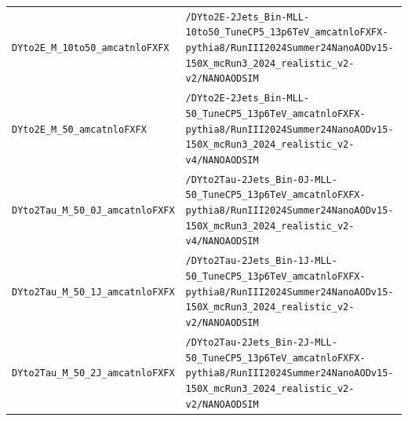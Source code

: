 \begin{longtable}{@{}>{\RaggedRight\arraybackslash}p{} >{\RaggedRight\arraybackslash}p{}@{}}
\addlinespace[2pt]
\texttt{DYto2E\_\allowbreak{}M\_\allowbreak{}10to50\_\allowbreak{}amcatnloFXFX} & \texttt{/\allowbreak{}DYto2E-\allowbreak{}2Jets\_\allowbreak{}Bin-\allowbreak{}MLL-\allowbreak{}10to50\_\allowbreak{}TuneCP5\_\allowbreak{}13p6TeV\_\allowbreak{}amcatnloFXFX-\allowbreak{}pythia8/\allowbreak{}RunIII2024Summer24NanoAODv15-\allowbreak{}150X\_\allowbreak{}mcRun3\_\allowbreak{}2024\_\allowbreak{}realistic\_\allowbreak{}v2-\allowbreak{}v2/\allowbreak{}NANOAODSIM} \\
\addlinespace[2pt]
\texttt{DYto2E\_\allowbreak{}M\_\allowbreak{}50\_\allowbreak{}amcatnloFXFX} & \texttt{/\allowbreak{}DYto2E-\allowbreak{}2Jets\_\allowbreak{}Bin-\allowbreak{}MLL-\allowbreak{}50\_\allowbreak{}TuneCP5\_\allowbreak{}13p6TeV\_\allowbreak{}amcatnloFXFX-\allowbreak{}pythia8/\allowbreak{}RunIII2024Summer24NanoAODv15-\allowbreak{}150X\_\allowbreak{}mcRun3\_\allowbreak{}2024\_\allowbreak{}realistic\_\allowbreak{}v2-\allowbreak{}v4/\allowbreak{}NANOAODSIM} \\
\addlinespace[2pt]
\texttt{DYto2Tau\_\allowbreak{}M\_\allowbreak{}50\_\allowbreak{}0J\_\allowbreak{}amcatnloFXFX} & \texttt{/\allowbreak{}DYto2Tau-\allowbreak{}2Jets\_\allowbreak{}Bin-\allowbreak{}0J-\allowbreak{}MLL-\allowbreak{}50\_\allowbreak{}TuneCP5\_\allowbreak{}13p6TeV\_\allowbreak{}amcatnloFXFX-\allowbreak{}pythia8/\allowbreak{}RunIII2024Summer24NanoAODv15-\allowbreak{}150X\_\allowbreak{}mcRun3\_\allowbreak{}2024\_\allowbreak{}realistic\_\allowbreak{}v2-\allowbreak{}v4/\allowbreak{}NANOAODSIM} \\
\addlinespace[2pt]
\texttt{DYto2Tau\_\allowbreak{}M\_\allowbreak{}50\_\allowbreak{}1J\_\allowbreak{}amcatnloFXFX} & \texttt{/\allowbreak{}DYto2Tau-\allowbreak{}2Jets\_\allowbreak{}Bin-\allowbreak{}1J-\allowbreak{}MLL-\allowbreak{}50\_\allowbreak{}TuneCP5\_\allowbreak{}13p6TeV\_\allowbreak{}amcatnloFXFX-\allowbreak{}pythia8/\allowbreak{}RunIII2024Summer24NanoAODv15-\allowbreak{}150X\_\allowbreak{}mcRun3\_\allowbreak{}2024\_\allowbreak{}realistic\_\allowbreak{}v2-\allowbreak{}v2/\allowbreak{}NANOAODSIM} \\
\addlinespace[2pt]
\texttt{DYto2Tau\_\allowbreak{}M\_\allowbreak{}50\_\allowbreak{}2J\_\allowbreak{}amcatnloFXFX} & \texttt{/\allowbreak{}DYto2Tau-\allowbreak{}2Jets\_\allowbreak{}Bin-\allowbreak{}2J-\allowbreak{}MLL-\allowbreak{}50\_\allowbreak{}TuneCP5\_\allowbreak{}13p6TeV\_\allowbreak{}amcatnloFXFX-\allowbreak{}pythia8/\allowbreak{}RunIII2024Summer24NanoAODv15-\allowbreak{}150X\_\allowbreak{}mcRun3\_\allowbreak{}2024\_\allowbreak{}realistic\_\allowbreak{}v2-\allowbreak{}v2/\allowbreak{}NANOAODSIM} \\

\end{longtable}
